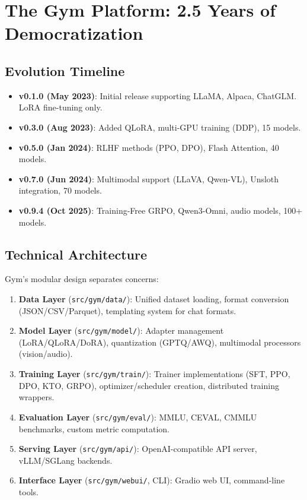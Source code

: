 \section{The Gym Platform: 2.5 Years of Democratization}


\subsection{Evolution Timeline}

\begin{itemize}
    \item \textbf{v0.1.0 (May 2023)}: Initial release supporting LLaMA, Alpaca, ChatGLM. LoRA fine-tuning only.
    \item \textbf{v0.3.0 (Aug 2023)}: Added QLoRA, multi-GPU training (DDP), 15 models.
    \item \textbf{v0.5.0 (Jan 2024)}: RLHF methods (PPO, DPO), Flash Attention, 40 models.
    \item \textbf{v0.7.0 (Jun 2024)}: Multimodal support (LLaVA, Qwen-VL), Unsloth integration, 70 models.
    \item \textbf{v0.9.4 (Oct 2025)}: Training-Free GRPO, Qwen3-Omni, audio models, 100+ models.
\end{itemize}

\subsection{Technical Architecture}

Gym's modular design separates concerns:

\begin{enumerate}
    \item \textbf{Data Layer} (\texttt{src/gym/data/}): Unified dataset loading, format conversion (JSON/CSV/Parquet), templating system for chat formats.
    \item \textbf{Model Layer} (\texttt{src/gym/model/}): Adapter management (LoRA/QLoRA/DoRA), quantization (GPTQ/AWQ), multimodal processors (vision/audio).
    \item \textbf{Training Layer} (\texttt{src/gym/train/}): Trainer implementations (SFT, PPO, DPO, KTO, GRPO), optimizer/scheduler creation, distributed training wrappers.
    \item \textbf{Evaluation Layer} (\texttt{src/gym/eval/}): MMLU, CEVAL, CMMLU benchmarks, custom metric computation.
    \item \textbf{Serving Layer} (\texttt{src/gym/api/}): OpenAI-compatible API server, vLLM/SGLang backends.
    \item \textbf{Interface Layer} (\texttt{src/gym/webui/}, CLI): Gradio web UI, command-line tools.
\end{enumerate}

